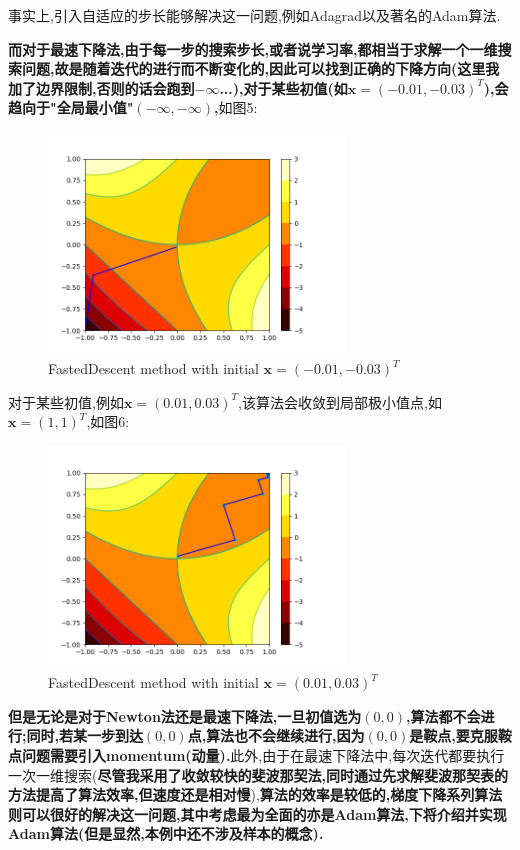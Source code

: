 \documentclass[UTF8,a4paper,11pt]{ctexart}
\begin{document}
\par 事实上,引入自适应的步长能够解决这一问题,例如Adagrad以及著名的Adam算法.
\par \textbf{而对于最速下降法,由于每一步的搜索步长,或者说学习率,都相当于求解一个一维搜索问题,故是随着迭代的进行而不断变化的,因此可以找到正确的下降方向(这里我加了边界限制,否则的话会跑到$-\infty$...),对于某些初值(如$\mathbf{x}=(-0.01,-0.03)^{T}$),会趋向于"全局最小值"$(-\infty,-\infty)$,}如图5:
\begin{figure}[htbp]
	\centering
	\includegraphics[width=0.7\textwidth,height=0.5\textwidth]{zuisu1.png}
	\caption{FastedDescent method with initial $\mathbf{x}=(-0.01,-0.03)^{T}$}
\end{figure}
\par 对于某些初值,例如$\mathbf{x}=(0.01,0.03)^T$,该算法会收敛到局部极小值点,如$\mathbf{x}=(1,1)^{T}$,如图6:
\begin{figure}[htbp]
	\centering
	\includegraphics[width=0.7\textwidth,height=0.5\textwidth]{zuisu2.png}
	\caption{FastedDescent method with initial $\mathbf{x}=(0.01,0.03)^{T}$}
\end{figure}
\par \textbf{但是无论是对于Newton法还是最速下降法,一旦初值选为$(0,0)$,算法都不会进行;同时,若某一步到达$(0,0)$点,算法也不会继续进行,因为$(0,0)$是鞍点,要克服鞍点问题需要引入momentum(动量).}此外,由于在最速下降法中,每次迭代都要执行一次一维搜索(\textbf{尽管我采用了收敛较快的斐波那契法,同时通过先求解斐波那契表的方法提高了算法效率,但速度还是相对慢}),\textbf{算法的效率是较低的,梯度下降系列算法则可以很好的解决这一问题,其中考虑最为全面的亦是Adam算法,下将介绍并实现Adam算法(但是显然,本例中还不涉及样本的概念).}
\end{document}
